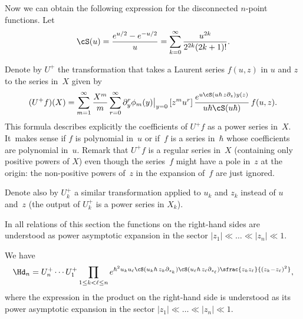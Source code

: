 Now we can obtain the following expression for the disconnected $n$-point functions. Let
\begin{equation*}
\cS(u)=\frac{e^{u/2}-e^{-u/2}}{u}=\sum_{k=0}^\infty\frac{u^{2k}}{2^{2k}(2k+1)!}.
\end{equation*}

\begin{definition}\label{def:U-operators}
Denote by $U^+$ the transformation that takes a Laurent series $f(u,z)$ in $u$ and $z$ to the series in~$X$ given by
\begin{equation}\label{eq:Uplusdef}
(U^+f)(X)=\sum_{m=1}^\infty \frac{X^{m}}{m}\sum_{r=0}^\infty
\partial_y^{r}\phi_{m}(y)\big|_{y=0}\,[z^mu^r]\,
\frac{e^{ u\cS(u\hbar\,z\partial_z)y(z) }}{u\hbar\cS(u\hbar)}\,f(u,z).
\end{equation}
This formula describes explicitly the coefficients of $U^+f$ as a power series in~$X$. It~makes sense if $f$ is polynomial in~$u$ or if~$f$ is a series in~$\hbar$ whose coefficients are polynomial in~$u$. Remark that $U^+f$ is a regular series in~$X$ (\ie containing only positive powers of $X$) even though the series~$f$ might have a pole in~$z$ at the origin: the non-positive powers of~$z$ in the expansion of~$f$ are just ignored.

Denote also by $U^+_k$ a similar transformation applied to $u_k$ and $z_k$ instead of $u$ and~$z$ (the output of $U^+_k$ is a power series in $X_k$).
\end{definition}

In all relations of this section
the functions on the right-hand sides are understood as power asymptotic expansion in the sector $|z_1|\ll\dots\ll|z_n|\ll1$.

\begin{proposition}\label{prop:HdU}
We have
\begin{equation}\label{eq:Hdprod}
\Hd_n=U^+_n\cdots U^+_1
\prod_{1\le k<\ell\le n}
e^{\hbar^2u_ku_\ell\cS(u_k\hbar\,z_k\partial_{z_k})\cS(u_\ell\hbar\,z_\ell \partial_{z_\ell})
\sfrac{z_k z_\ell}{(z_k-z_\ell)^2}},
\end{equation}
where the expression in the product on the right-hand side is understood as its power asymptotic expansion in the sector $|z_1|\ll\dots\ll|z_n|\ll1$.
\end{proposition}

